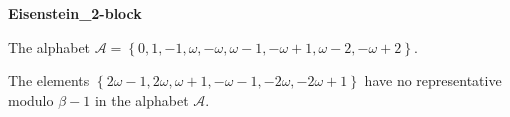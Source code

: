 \begin{exmp}
\textbf{ Eisenstein\_2-block }

\label{ex:Eisenstein2-block}

The alphabet $\mathcal{A} =\left\{0, 1, -1, \omega, -\omega, \omega - 1, -\omega + 1, \omega - 2, -\omega + 2\right\}$.

The elements $ \left\{2\omega - 1, 2\omega, \omega + 1, -\omega - 1, -2\omega, -2\omega + 1\right\} $ have no representative  modulo $\beta-1$ in the alphabet $\mathcal{A}$.
\end{exmp}